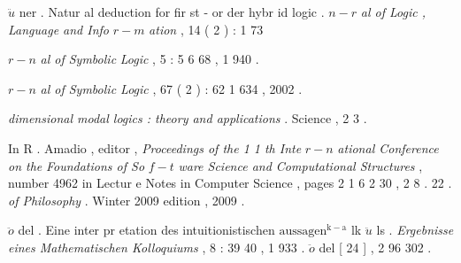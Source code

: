 \documentclass[10pt]{article}
\begin{document}
   $ \ddot{u} $  {\small ner . Natur al deduction for fir st - or der hybr id logic . }   $ n-r $  {\small \textit{al of Logic , } } 
 {\small \textit{Language and Info } }  $ r-m $  {\small \textit{ation } , 14 ( 2 ) : 1 73 }  

    $ r-n $  {\small \textit{al of Symbolic } } 
 {\small \textit{Logic } , 5 : 5 6 68 , 1 940 . } 

       $ r-n $  {\small \textit{al of Symbolic Logic } , } 
 {\small 67 ( 2 ) : 62 1 634 , 2002 . } 

    
 {\small \textit{dimensional modal logics : theory and applications } . }  
 {\small Science , 2 3 . } 

  
 {\small In R . Amadio , editor , \textit{Proceedings of the 1 1 th Inte } }  $ r-n $  {\small \textit{ational Conference on the } } 
 {\small \textit{Foundations of So } }  $ f-t $  {\small \textit{ware Science and Computational Structures } , number 4962 in } 
 {\small Lectur e Notes in Computer Science , pages 2 1 6 2 30 , 2 8 . } 
 {\small 22 . }  
 {\small \textit{of Philosophy } . Winter 2009 edition , 2009 . } 


\newpage
{}   $ \ddot{o} $  {\small del . Eine inter pr etation des intuitionistischen }  $ \mathrm{aussagen} ^{ \mathrm{k-a} }$  {\small lk }  $ \ddot{u} $  {\small ls . \textit{Ergebnisse } } 
 {\small \textit{eines Mathematischen Kolloquiums } , 8 : 39 40 , 1 933 . }   $ \ddot{o} $  {\small del [ 24 ] , } 
 {\small 2 96 302 . } 
\end{document}
